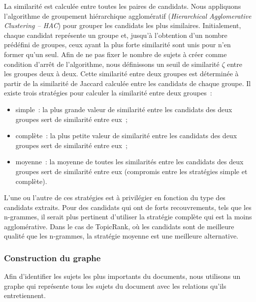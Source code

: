         La similarité est calculée entre toutes les paires de candidats. Nous
        appliquons l'algorithme de groupement hiérarchique agglomératif
        (\textit{Hierarchical Agglomerative Clustering -- \textsc{HAC}}) pour
        grouper les candidats les plus similaires. Initialement, chaque candidat
        représente un groupe et, jusqu'à l'obtention d'un nombre prédéfini de
        groupes, ceux ayant la plus forte similarité sont unis pour n'en former
        qu'un seul. Afin de ne pas fixer le nombre de sujets à créer comme
        condition d'arrêt de l'algorithme, nous définissons un seuil de
        similarité $\zeta$ entre les groupes deux à deux. Cette similarité entre
        deux groupes est déterminée à partir de la similarité de Jaccard
        calculée entre les candidats de chaque groupe. Il existe trois
        stratégies pour calculer la similarité entre deux groupes~:
        \begin{itemize}
          \item{simple~: la plus grande valeur de similarité entre les candidats
                des deux groupes sert de similarité entre eux~;}
          \item{complète~: la plus petite valeur de similarité entre les
                candidats des deux groupes sert de similarité entre eux~;}
          \item{moyenne~: la moyenne de toutes les similarités entre les
                candidats des deux groupes sert de similarité entre eux
                (compromis entre les stratégies simple et complète).}
        \end{itemize}
        L'une ou l'autre de ces stratégies est à privilégier en fonction du type
        des candidats extraits. Pour des candidats qui ont de forts
        recouvrements, tels que les n-grammes, il serait plus pertinent
        d'utiliser la stratégie complète qui est la moins agglomérative. Dans le
        cas de TopicRank, où les candidats sont de meilleure qualité que les
        n-grammes, la stratégie moyenne est une meilleure alternative.


      \subsubsection{Construction du graphe}
      \label{subsubsec:main-automatic_keyphrase_annotation-unsupervised_automatic_keyphrase_extraction-topicrank-graph_construction}
        Afin d'identifier les sujets les plus importants du documents, nous
        utilisons un graphe qui représente tous les sujets du document avec les
        relations qu'ils entretiennent.

